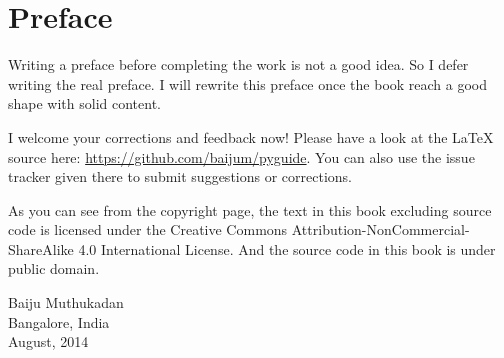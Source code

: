 \cleardoublepage
{}
\chapter*{Preface}

Writing a preface before completing the work is not a good idea.  So I
defer writing the real preface.  I will rewrite this preface once the
book reach a good shape with solid content.

I welcome your corrections and feedback now!  Please have a look at
the \LaTeX{} source here: \url{https://github.com/baijum/pyguide}.  You
can also use the issue tracker given there to submit suggestions or
corrections.

As you can see from the copyright page, the text in this book
excluding source code is licensed under the Creative Commons
Attribution-NonCommercial-ShareAlike 4.0 International License.  And
the source code in this book is under public domain.

\vspace*{.5in}
Baiju Muthukadan\\
Bangalore, India\\
August, 2014
